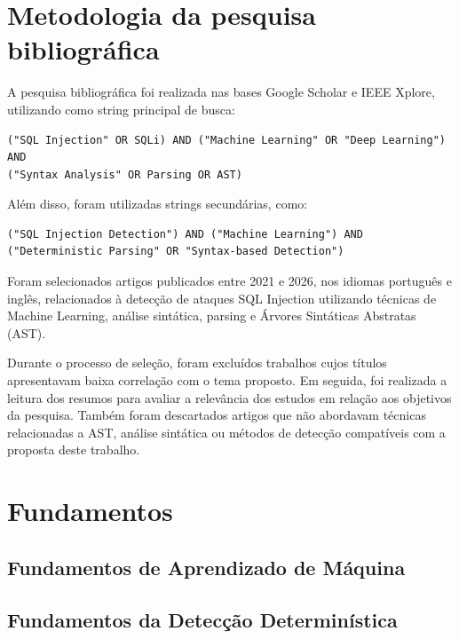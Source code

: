 \documentclass[
    12pt,                %
    openright,           %
    oneside,             %
    a4paper,             %
    english,             %
    brazil               %
]{abntex2}
\begin{document}
\section{Metodologia da pesquisa bibliográfica}
\label{sec:metodologia_pesquisa}

A pesquisa bibliográfica foi realizada nas bases Google Scholar e IEEE Xplore, utilizando como string principal de busca:

\begin{lstlisting}
("SQL Injection" OR SQLi) AND ("Machine Learning" OR "Deep Learning") AND   
("Syntax Analysis" OR Parsing OR AST)
\end{lstlisting}

Além disso, foram utilizadas strings secundárias, como:

\begin{lstlisting}
("SQL Injection Detection") AND ("Machine Learning") AND ("Deterministic Parsing" OR "Syntax-based Detection")
\end{lstlisting}

Foram selecionados artigos publicados entre 2021 e 2026, nos idiomas português e inglês, relacionados à detecção de ataques SQL Injection utilizando técnicas de Machine Learning, análise sintática, parsing e Árvores Sintáticas Abstratas (AST).

Durante o processo de seleção, foram excluídos trabalhos cujos títulos apresentavam baixa correlação com o tema proposto. Em seguida, foi realizada a leitura dos resumos para avaliar a relevância dos estudos em relação aos objetivos da pesquisa. Também foram descartados artigos que não abordavam técnicas relacionadas a AST, análise sintática ou métodos de detecção compatíveis com a proposta deste trabalho.

\section{Fundamentos}
\label{sec:fundamentos}


\subsection{Fundamentos de Aprendizado de Máquina}

\subsection{Fundamentos da Detecção Determinística}
\end{document}
